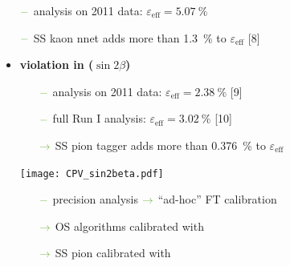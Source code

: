 {\begin{minipage}{0.474\boxwidth}
\begin{itemize}
	\begin{itemize}
	\setlength\itemsep{0.01em}
	\setlength{\itemindent}{-.11in}
	\item[${\color{tu_gruen}-}$] analysis on \num{2011} data: $\varepsilon_\text{eff}=\SI{5.07}{\%}$
	\item[${\color{tu_gruen}-}$] SS kaon nnet adds more than \SI{1.3}{\%} to $\varepsilon_\text{eff}$ [8]
	\end{itemize}
\end{itemize}
\end{minipage}
\vspace{0.7em}
\hfill
\begin{minipage}{0.474\boxwidth}
\vspace{-0.3em}
\begin{itemize}
\item\textbf{\CP violation in \BdToJPsiKS ($\sin2\beta$)}
\vspace{-0.2em}
	\begin{itemize}
	\setlength\itemsep{0.01em}
	\setlength{\itemindent}{-.11in}
	\item[${\color{tu_gruen}-}$] analysis on \num{2011} data: $\varepsilon_\text{eff}=\SI{2.38}{\%}$ [9]
	\item[${\color{tu_gruen}-}$] full Run I analysis: $\varepsilon_\text{eff}=\SI{3.02}{\%}$ [10] 
	\setlength{\itemindent}{.05in} 
	\item[${\color{tu_gruen}\rightarrow}$] SS pion tagger adds more than \SI{0.376}{\%} to $\varepsilon_\text{eff}$ 
	\end{itemize}
	
\vspace{-1.7em}
\begin{center}
\texttt{[image: CPV\_sin2beta.pdf]}
\end{center}
\vspace{-2.5em}

	\begin{itemize}
	\setlength{\itemindent}{-.11in}
	\setlength\itemsep{0.01em}
	\item[${\color{tu_gruen}-}$] precision analysis \hspace{0.1em}${\color{tu_gruen}\rightarrow}$ ``ad-hoc'' FT calibration
	\setlength{\itemindent}{.05in}
	\item[${\color{tu_gruen}\rightarrow}$] OS algorithms calibrated with \BuToJPsiKp 
	\item[${\color{tu_gruen}\rightarrow}$] SS pion calibrated with \BdToJPsiKst
	\end{itemize}


\end{itemize}
\end{minipage}}
